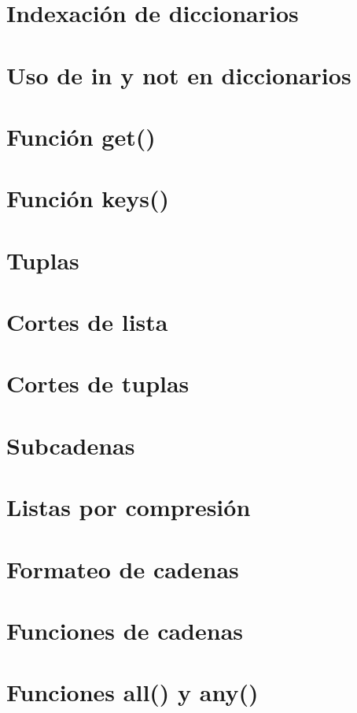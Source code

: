 \documentclass{report}
\begin{document}

\section{Indexación de diccionarios}

\section{Uso de in y not en diccionarios}

\section{Función get()}

\section{Función keys()}

\section{Tuplas}

\section{Cortes de lista}

\section{Cortes de tuplas}

\section{Subcadenas}

\section{Listas por compresión}

\section{Formateo de cadenas}

\section{Funciones de cadenas}

\section{Funciones all() y any()}
\end{document}
